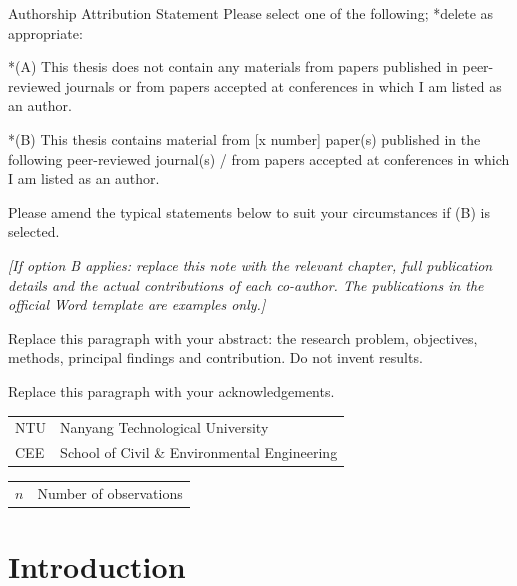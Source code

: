 \documentclass[12pt,a4paper,oneside]{report}
\begin{document}
\begin{CEEdeclaration}{Authorship Attribution Statement}
Please select one of the following; *delete as appropriate:

*(A) This thesis does not contain any materials from papers published in peer-reviewed journals or from papers accepted at conferences in which I am listed as an author.

*(B) This thesis contains material from [x number] paper(s) published in the following peer-reviewed journal(s) / from papers accepted at conferences in which I am listed as an author.

Please amend the typical statements below to suit your circumstances if (B) is selected.

\textit{[If option B applies: replace this note with the relevant chapter,
full publication details and the actual contributions of each co-author.
The publications in the official Word template are examples only.]}

\end{CEEdeclaration}

Replace this paragraph with your abstract: the research problem, objectives,
methods, principal findings and contribution. Do not invent results.

Replace this paragraph with your acknowledgements.

\begin{tabular}{@{}ll@{}}
  NTU & Nanyang Technological University\\
  CEE & School of Civil \& Environmental Engineering
\end{tabular}

\begin{tabular}{@{}ll@{}}
  $n$ & Number of observations
\end{tabular}

\CEElistoffigures
\CEElistoftables
\tableofcontents

\CEEmainmatter
% 
\chapter{Introduction}
\end{document}
